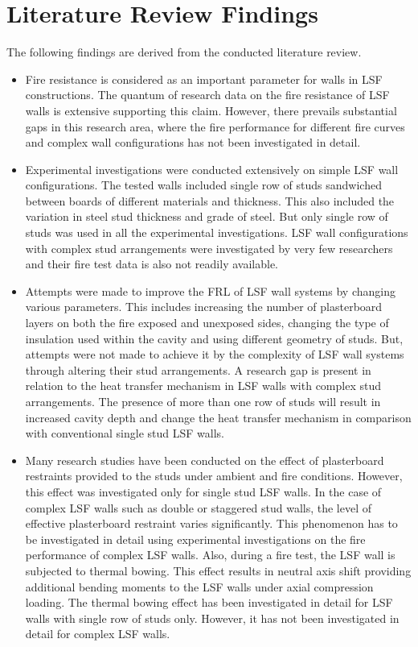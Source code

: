 \section{Literature Review Findings}
The following findings are derived from the conducted literature review.
\begin{itemize}
	\item Fire resistance is considered as an important parameter for walls in LSF constructions. The quantum of research data on the fire resistance of LSF walls is extensive supporting this claim. However, there prevails substantial gaps in this research area, where the fire performance for different fire curves and complex wall configurations has not been investigated in detail. 
	\item Experimental investigations were conducted extensively on simple LSF wall configurations. The tested walls included single row of studs sandwiched between boards of different materials and thickness. This also included the variation in steel stud thickness and grade of steel. But only single row of studs was used in all the experimental investigations. LSF wall configurations with complex stud arrangements were investigated by very few researchers and their fire test data is also not readily available.
	\item Attempts were made to improve the FRL of LSF wall systems by changing various parameters. This includes increasing the number of plasterboard layers on both the fire exposed and unexposed sides, changing the type of insulation used within the cavity and using different geometry of studs. But, attempts were not made to achieve it by the complexity of LSF wall systems through altering their stud arrangements. A research gap is present in relation to the heat transfer mechanism in LSF walls with complex stud arrangements. The presence of more than one row of studs will result in increased cavity depth and change the heat transfer mechanism in comparison with conventional single stud LSF walls.
	\item Many research studies have been conducted on the effect of plasterboard restraints provided to the studs under ambient and fire conditions. However, this effect was investigated only for single stud LSF walls. In the case of complex LSF walls such as double or staggered stud walls, the level of effective plasterboard restraint varies significantly. This phenomenon has to be investigated in detail using experimental investigations on the fire performance of complex LSF walls. Also, during a fire test, the LSF wall is subjected to thermal bowing. This effect results in neutral axis shift providing additional bending moments to the LSF walls under axial compression loading. The thermal bowing effect has been investigated in detail for LSF walls with single row of studs only. However, it has not been investigated in detail for complex LSF walls.    

\end{itemize}
